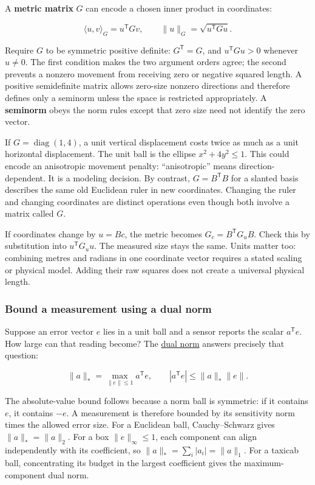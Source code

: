 A \textbf{metric matrix} \(G\) can encode a chosen inner product in coordinates:

\[
\langle u,v\rangle_G=u^{\mathsf T}Gv,\qquad
\|u\|_G=\sqrt{u^{\mathsf T}Gu}.
\]

Require \(G\) to be symmetric positive definite: \(G^{\mathsf T}=G\), and \(u^{\mathsf T}Gu>0\) whenever \(u\ne0\). The first condition makes the two argument orders agree; the second prevents a nonzero movement from receiving zero or negative squared length. A positive semidefinite matrix allows zero-size nonzero directions and therefore defines only a seminorm unless the space is restricted appropriately. A \textbf{seminorm} obeys the norm rules except that zero size need not identify the zero vector.

If \(G=\operatorname{diag}(1,4)\), a unit vertical displacement costs twice as much as a unit horizontal displacement. The unit ball is the ellipse \(x^2+4y^2\le1\). This could encode an anisotropic movement penalty: ``anisotropic'' means direction-dependent. It is a modeling decision. By contrast, \(G=B^{\mathsf T}B\) for a slanted basis describes the same old Euclidean ruler in new coordinates. Changing the ruler and changing coordinates are distinct operations even though both involve a matrix called \(G\).

If coordinates change by \(u=Bc\), the metric becomes \(G_c=B^{\mathsf T}G_uB\). Check this by substitution into \(u^{\mathsf T}G_uu\). The measured size stays the same. Units matter too: combining metres and radians in one coordinate vector requires a stated scaling or physical model. Adding their raw squares does not create a universal physical length.

\subsubsection{Bound a measurement using a dual norm}\label{bound-a-measurement-using-a-dual-norm}

Suppose an error vector \(e\) lies in a unit ball and a sensor reports the scalar \(a^{\mathsf T}e\). How large can that reading become? The \hyperref[appendix-d6d9dbbe3c14]{dual norm} answers precisely that question:

\[
\|a\|_* = \max_{\|e\|\le1} a^{\mathsf T}e,
\qquad |a^{\mathsf T}e|\le\|a\|_*\|e\|.
\]

The absolute-value bound follows because a norm ball is symmetric: if it contains \(e\), it contains \(-e\). A measurement is therefore bounded by its sensitivity norm times the allowed error size. For a Euclidean ball, Cauchy--Schwarz gives \(\|a\|_* =\|a\|_2\). For a box \(\|e\|_\infty\le1\), each component can align independently with its coefficient, so \(\|a\|_* =\sum_i|a_i|=\|a\|_1\). For a taxicab ball, concentrating its budget in the largest coefficient gives the maximum-component dual norm.

